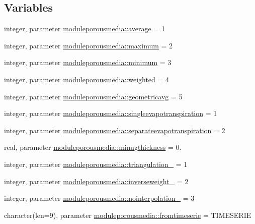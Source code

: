 \subsection*{Variables}
\begin{DoxyCompactItemize}
\item 
integer, parameter \mbox{\hyperlink{namespacemoduleporousmedia_a5730b454f11628ff395e43c5a795d3d7}{moduleporousmedia\+::average}} = 1
\item 
integer, parameter \mbox{\hyperlink{namespacemoduleporousmedia_aaa8cb214ea1121336b19f217f44e094d}{moduleporousmedia\+::maximum}} = 2
\item 
integer, parameter \mbox{\hyperlink{namespacemoduleporousmedia_aeacb9ecf515364a343f1c8807d0d03a8}{moduleporousmedia\+::minimum}} = 3
\item 
integer, parameter \mbox{\hyperlink{namespacemoduleporousmedia_a65d641f3f69c2f8685c3dc6620a53cdc}{moduleporousmedia\+::weighted}} = 4
\item 
integer, parameter \mbox{\hyperlink{namespacemoduleporousmedia_adb7574495c916a0ce17e626b67eda28b}{moduleporousmedia\+::geometricavg}} = 5
\item 
integer, parameter \mbox{\hyperlink{namespacemoduleporousmedia_a9dbee5252241abf509cd0d987d379a8e}{moduleporousmedia\+::singleevapotranspiration}} = 1
\item 
integer, parameter \mbox{\hyperlink{namespacemoduleporousmedia_ab621a4e17a5e9b199140296dc23c46dc}{moduleporousmedia\+::separateevapotranspiration}} = 2
\item 
real, parameter \mbox{\hyperlink{namespacemoduleporousmedia_a4e3d5ff3f6291d44bcd01d8f0357cf5f}{moduleporousmedia\+::minugthickness}} = 0.
\item 
integer, parameter \mbox{\hyperlink{namespacemoduleporousmedia_ab6920bd67d176c0022920b53355df066}{moduleporousmedia\+::triangulation\+\_\+}} = 1
\item 
integer, parameter \mbox{\hyperlink{namespacemoduleporousmedia_a3940ae95403224b561f66cef3c75aaab}{moduleporousmedia\+::inverseweight\+\_\+}} = 2
\item 
integer, parameter \mbox{\hyperlink{namespacemoduleporousmedia_a4867a391fa2e9b3c575ab6606ed45e1b}{moduleporousmedia\+::nointerpolation\+\_\+}} = 3
\item 
character(len=9), parameter \mbox{\hyperlink{namespacemoduleporousmedia_a9e5f5886dde3038543ba592a0f590876}{moduleporousmedia\+::fromtimeserie}} = \textquotesingle{}T\+I\+M\+E\+S\+E\+R\+IE\textquotesingle{}
\item 

\end{DoxyCompactItemize}
